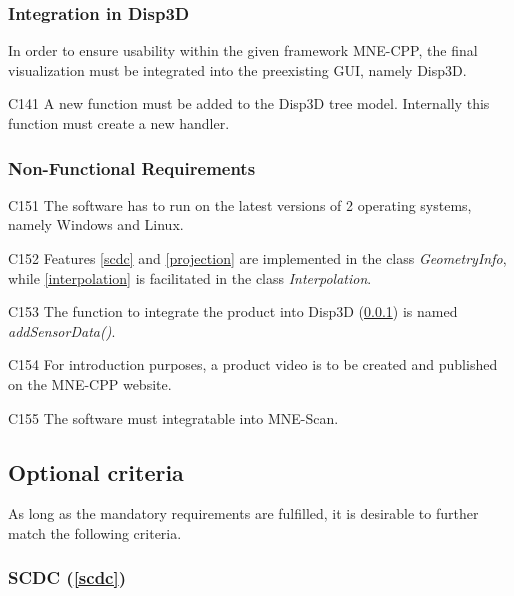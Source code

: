 \subsubsection{Integration in Disp3D} \label{integration}
	
	In order to ensure usability within the given framework MNE-CPP, the final visualization must be integrated into the 			preexisting GUI, namely Disp3D.
	
	\begin{aims}
		
		\item[C141] A new function must be added to the Disp3D tree model. Internally this function must create a new 								handler. 
		
	\end{aims}
	
\subsubsection{Non-Functional Requirements}		
	
	
	\begin{aims}

		\item[C151] The software has to run on the latest versions of 2 operating systems, namely Windows and Linux. 
		\item[C152] Features \ref{scdc} and \ref{projection} are implemented in the class \textit{GeometryInfo}, while \ref{interpolation} is facilitated in the class \textit{Interpolation}.
		\item[C153] The function to integrate the product into Disp3D (\ref{integration}) is named \textit{addSensorData()}.
		\item[C154] For introduction purposes, a product video is to be created and published on the MNE-CPP website.  
		\item[C155] The software must integratable into MNE-Scan. 
	\end{aims}
	
\newpage	
	
\subsection{Optional criteria}
	
	As long as the mandatory requirements are fulfilled, it is desirable to further match the following criteria. 	
	
\subsubsection[SCDC]{SCDC (\ref{scdc})}
	
